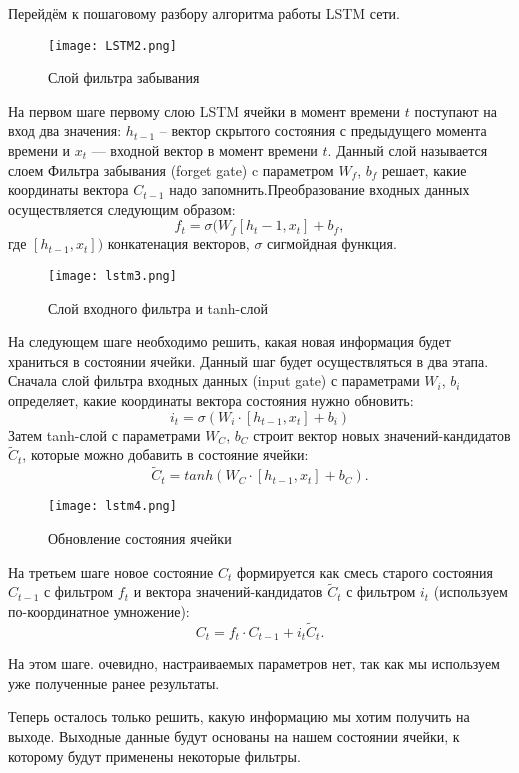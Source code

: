 \documentclass{article}
\begin{document}
Перейдём к пошаговому разбору алгоритма работы LSTM сети. 

 \begin{figure}[H]
	    
	        \texttt{[image: LSTM2.png]}
	        \caption{Слой фильтра забывания}
	    \end{figure}
     
На первом шаге первому слою LSTM ячейки в момент времени $t$ поступают на вход два значения: $h_{t-1}$ -- вектор скрытого состояния с предыдущего момента времени и $x_t$ — входной вектор в момент времени $t$. 
Данный слой называется слоем Фильтра забывания (forget gate) c 
параметром $W_f$, $b_f$
решает, какие координаты вектора $C_{t-1}$ надо запомнить.Преобразование входных данных
осуществляется следующим образом:
$$f_t=\sigma(W_f[h_t-1,x_t]+b_f,$$
где $[h_{t-1},x_t])$ конкатенация векторов,
$\sigma$ сигмойдная функция.

 \begin{figure}[H]
	        \centering
	        \texttt{[image: lstm3.png]}
	         \caption{Слой входного фильтра и tanh-слой}
	    \end{figure}
     
На следующем шаге необходимо решить, какая новая информация будет храниться в состоянии ячейки. Данный шаг будет осуществляться в два этапа. Сначала слой
фильтра входных данных (input gate) с параметрами $W_i$, $b_i$ определяет, какие
координаты вектора состояния нужно обновить:
$$i_t=\sigma(W_i\cdot [h_{t-1},x_t]+b_i)$$
Затем tanh-слой с параметрами $W_C$, $b_C$ строит вектор новых значений-кандидатов
$\widetilde{C}_t$, которые можно добавить в состояние ячейки:
$$\widetilde{C}_t=tanh(W_C\cdot[h_{t-1},x_t]+b_C).$$

\begin{figure}[H]
	\centering
	    \texttt{[image: lstm4.png]}
	\caption{Обновление состояния ячейки}
\end{figure}

На третьем шаге новое состояние $C_t$ формируется как смесь старого состояния $C_{t-1}$ с фильтром $f_t$ и вектора значений-кандидатов $\widetilde{C}_t$ с фильтром $i_t$ (используем по-координатное умножение):
$$C_t=f_t\cdot C_{t-1}+i_t\widetilde{C}_t.$$
  
На этом шаге. очевидно, настраиваемых параметров нет, так как мы используем
уже полученные ранее результаты.

Теперь осталось только решить, какую информацию мы хотим получить на выходе. Выходные данные будут основаны на нашем состоянии ячейки, к которому будут
применены некоторые фильтры.
\end{document}
